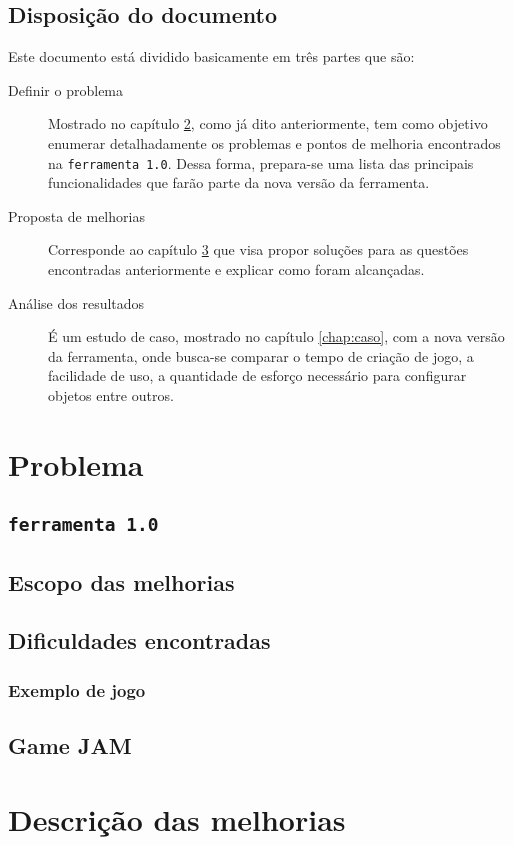 \documentclass[12pt,twoside,openright,a4paper,english,brazil,sumario=tradicional]{abntex2}
\begin{document}
\section{Disposição do documento}
Este documento está dividido basicamente em três partes que são:
\begin{description}
	\item[Definir o problema] Mostrado no capítulo \ref{chap:problemas}, como já dito anteriormente, tem como objetivo enumerar detalhadamente os problemas e pontos de melhoria encontrados na \texttt{ferramenta 1.0}. Dessa forma, prepara-se uma lista das principais funcionalidades que farão parte da nova versão da ferramenta.
	\item[Proposta de melhorias] Corresponde ao capítulo \ref{chap:melhorias} que visa propor soluções para as questões encontradas anteriormente e explicar como foram alcançadas.
	\item[Análise dos resultados] É um estudo de caso, mostrado no capítulo \ref{chap:caso}, com a nova versão da ferramenta, onde busca-se comparar o tempo de criação de jogo, a facilidade de uso, a quantidade de esforço necessário para configurar objetos entre outros.
\end{description}

\chapter{Problema}
\label{chap:problemas}
\section{\texttt{ferramenta 1.0}}
\section{Escopo das melhorias}
\section{Dificuldades encontradas}
\subsection{Exemplo de jogo}
\section{Game JAM}

\chapter{Descrição das melhorias} %
\label{chap:melhorias}
\end{document}
